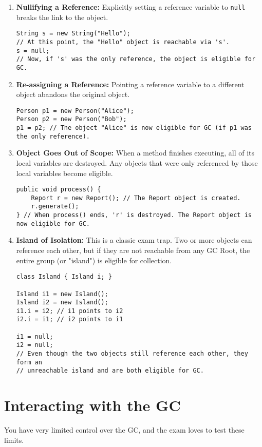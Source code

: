 \documentclass[12pt]{article}
\begin{document}
\begin{enumerate}[label=(\arabic*)]
\begin{enumerate}
    \item \textbf{Nullifying a Reference:} Explicitly setting a reference variable to \texttt{null} breaks the link to the object.
    \begin{verbatim}
String s = new String("Hello");
// At this point, the "Hello" object is reachable via 's'.
s = null; 
// Now, if 's' was the only reference, the object is eligible for GC.
    \end{verbatim}

    \item \textbf{Re-assigning a Reference:} Pointing a reference variable to a different object abandons the original object.
    \begin{verbatim}
Person p1 = new Person("Alice");
Person p2 = new Person("Bob");
p1 = p2; // The object "Alice" is now eligible for GC (if p1 was the only reference).
    \end{verbatim}

    \item \textbf{Object Goes Out of Scope:} When a method finishes executing, all of its local variables are destroyed. Any objects that were only referenced by those local variables become eligible.
    \begin{verbatim}
public void process() {
    Report r = new Report(); // The Report object is created.
    r.generate();
} // When process() ends, 'r' is destroyed. The Report object is now eligible for GC.
    \end{verbatim}

    \item \textbf{Island of Isolation:} This is a classic exam trap. Two or more objects can reference each other, but if they are not reachable from any GC Root, the entire group (or "island") is eligible for collection.
    \begin{verbatim}
class Island { Island i; }

Island i1 = new Island();
Island i2 = new Island();
i1.i = i2; // i1 points to i2
i2.i = i1; // i2 points to i1

i1 = null;
i2 = null;
// Even though the two objects still reference each other, they form an
// unreachable island and are both eligible for GC.
    \end{verbatim}
\end{enumerate}

\section{Interacting with the GC}
You have very limited control over the GC, and the exam loves to test these limits.


\end{enumerate}
\end{document}

